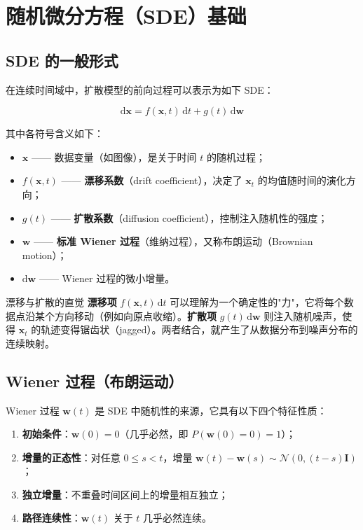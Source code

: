 \section{随机微分方程（SDE）基础}

\subsection{SDE 的一般形式}

在连续时间域中，扩散模型的前向过程可以表示为如下 SDE：

$$
\mathrm{d}\mathbf{x} = f(\mathbf{x}, t)\,\mathrm{d}t + g(t)\,\mathrm{d}\mathbf{w}
$$

其中各符号含义如下：

\begin{itemize}
    \item $\mathbf{x}$ —— 数据变量（如图像），是关于时间 $t$ 的随机过程；
    \item $f(\mathbf{x}, t)$ —— \textbf{漂移系数}（drift coefficient），决定了 $\mathbf{x}_t$ 的均值随时间的演化方向；
    \item $g(t)$ —— \textbf{扩散系数}（diffusion coefficient），控制注入随机性的强度；
    \item $\mathbf{w}$ —— \textbf{标准 Wiener 过程}（维纳过程），又称布朗运动（Brownian motion）；
    \item $\mathrm{d}\mathbf{w}$ —— Wiener 过程的微小增量。
\end{itemize}

\begin{importantbox}{漂移与扩散的直觉}
\textbf{漂移项} $f(\mathbf{x}, t)\,\mathrm{d}t$ 可以理解为一个确定性的"力"，它将每个数据点沿某个方向移动（例如向原点收缩）。\textbf{扩散项} $g(t)\,\mathrm{d}\mathbf{w}$ 则注入随机噪声，使得 $\mathbf{x}_t$ 的轨迹变得锯齿状（jagged）。两者结合，就产生了从数据分布到噪声分布的连续映射。
\end{importantbox}

\subsection{Wiener 过程（布朗运动）}

Wiener 过程 $\mathbf{w}(t)$ 是 SDE 中随机性的来源，它具有以下四个特征性质：

\begin{enumerate}
    \item \textbf{初始条件}：$\mathbf{w}(0) = 0$（几乎必然，即 $P(\mathbf{w}(0)=0) = 1$）；
    \item \textbf{增量的正态性}：对任意 $0 \le s < t$，增量 $\mathbf{w}(t) - \mathbf{w}(s) \sim \mathcal{N}(0, (t-s)\mathbf{I})$；
    \item \textbf{独立增量}：不重叠时间区间上的增量相互独立；
    \item \textbf{路径连续性}：$\mathbf{w}(t)$ 关于 $t$ 几乎必然连续。
\end{enumerate}

